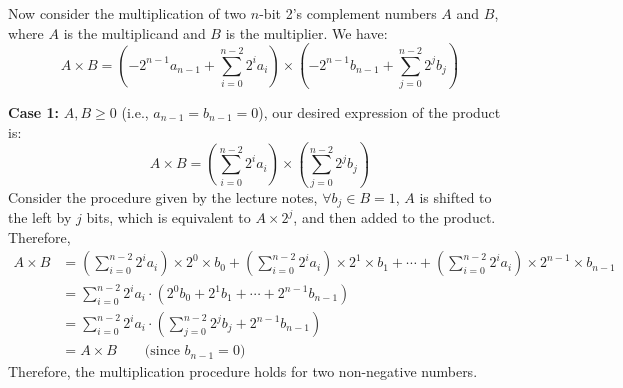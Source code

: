 \documentclass[answers]{exam}
\begin{document}
\begin{questions}
\begin{solution}
        Now consider the multiplication of two $n$-bit 2's complement numbers $A$ and $B$,
        where $A$ is the multiplicand and $B$ is the multiplier. We have:
        \[
            A\times B = \left(-2^{n-1}a_{n-1} + \sum_{i=0}^{n-2} 2^i a_i\right) \times \left(-2^{n-1}b_{n-1} + \sum_{j=0}^{n-2} 2^j b_j\right)
        \]

        \textbf{Case 1:} $A, B \geq 0$ (i.e., $a_{n-1} = b_{n-1} = 0$), our desired expression of the product is:
        \begin{equation}
            A\times B = \left(\sum_{i=0}^{n-2} 2^i a_i\right) \times \left(\sum_{j=0}^{n-2} 2^j b_j\right)
        \end{equation}
        Consider the procedure given by the lecture notes, $\forall b_j \in B = 1$, $A$ is shifted to the left by $j$ bits,
        which is equivalent to $A \times 2^j$, and then added to the product. Therefore,
        \begin{align*}
            A\times B &= \left(\sum_{i=0}^{n-2}2^ia_i\right)\times 2^0 \times b_0 + \left(\sum_{i=0}^{n-2}2^ia_i\right)\times 2^1 \times b_1 + \cdots + \left(\sum_{i=0}^{n-2}2^ia_i\right)\times 2^{n-1} \times b_{n-1} \\
            &= \sum_{i=0}^{n-2} 2^i a_i \cdot \left(2^0 b_0 + 2^1 b_1 + \cdots + 2^{n-1} b_{n-1}\right) \\
            &= \sum_{i=0}^{n-2} 2^i a_i \cdot \left(\sum_{j=0}^{n-2} 2^j b_j + 2^{n-1}b_{n-1}\right) \\
            &= A \times B \qquad \text{(since } b_{n-1} = 0\text{)}
        \end{align*}
        Therefore, the multiplication procedure holds for two non-negative numbers.


\end{solution}
\end{questions}
\end{document}
